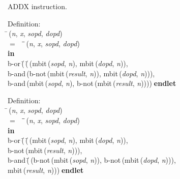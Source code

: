  ADDX instruction.
\begin{tabbing}{\sc Definition}: \\  
\=\,({\it{n\/}}, {\it{x\/}}, {\it{sopd\/}}, {\it{dopd\/}}) \\ 
$=$$\;\;\;\;$\=\=\,({\it{n\/}}, {\it{x\/}}, {\it{sopd\/}}, {\it{dopd\/}})\- \\ 
{\bf in} \\ 
{\rm{b-or}}\,(\=\,(\=\,({\rm{mbit}}\,({\it{sopd\/}}, {\it{n\/}}), {\rm{mbit}}\,({\it{dopd\/}}, {\it{n\/}})), \\ 
{\rm{b-and}}\,({\rm{b-not}}\,({\rm{mbit}}\,({\it{result\/}}, {\it{n\/}})), {\rm{mbit}}\,({\it{dopd\/}}, {\it{n\/}})))\-, \\ 
{\rm{b-and}}\,({\rm{mbit}}\,({\it{sopd\/}}, {\it{n\/}}), {\rm{b-not}}\,({\rm{mbit}}\,({\it{result\/}}, {\it{n\/}}))))\-$\;${\bf  endlet}\-\-
\end{tabbing}

\begin{tabbing}{\sc Definition}: \\  
\=\,({\it{n\/}}, {\it{x\/}}, {\it{sopd\/}}, {\it{dopd\/}}) \\ 
$=$$\;\;\;\;$\=\=\,({\it{n\/}}, {\it{x\/}}, {\it{sopd\/}}, {\it{dopd\/}})\- \\ 
{\bf in} \\ 
{\rm{b-or}}\,(\=\,(\=\,({\rm{mbit}}\,({\it{sopd\/}}, {\it{n\/}}), {\rm{mbit}}\,({\it{dopd\/}}, {\it{n\/}})), \\ 
{\rm{b-not}}\,({\rm{mbit}}\,({\it{result\/}}, {\it{n\/}})))\-, \\ 
{\rm{b-and}}\,(\=\,({\rm{b-not}}\,({\rm{mbit}}\,({\it{sopd\/}}, {\it{n\/}})), {\rm{b-not}}\,({\rm{mbit}}\,({\it{dopd\/}}, {\it{n\/}}))), \\ 
{\rm{mbit}}\,({\it{result\/}}, {\it{n\/}}))\-)\-$\;${\bf  endlet}\-\-
\end{tabbing}

